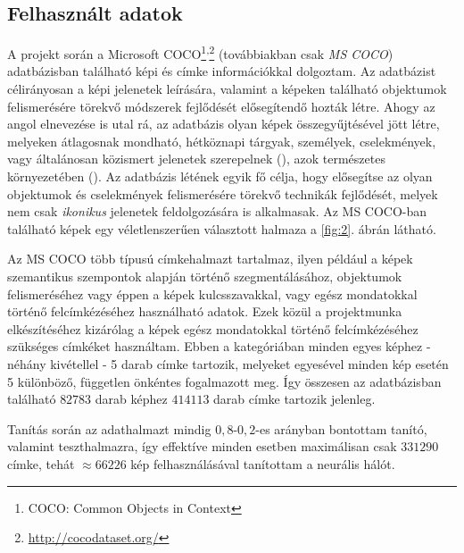 \begin{multicols}{2}
\section{Felhasznált adatok} \label{section:2}
A projekt során a Microsoft COCO\footnote{COCO: Common Objects in Context}\textsuperscript{,}\footnote{\url{http://cocodataset.org/}}\citep{2014arXiv1405.0312L} (továbbiakban csak \emph{MS COCO}) adatbázisban található képi és címke információkkal dolgoztam. Az adatbázist célirányosan a képi jelenetek leírására, valamint a képeken található objektumok felismerésére törekvő módszerek fejlődését elősegítendő hozták létre. Ahogy az angol elnevezése is utal rá, az adatbázis olyan képek összegyűjtésével jött létre, melyeken átlagosnak mondható, hétköznapi tárgyak, személyek, cselekmények, vagy általánosan közismert jelenetek szerepelnek (\emph{}), azok természetes környezetében (\emph{}). Az adatbázis létének egyik fő célja, hogy elősegítse az olyan objektumok és cselekmények felismerésére törekvő technikák fejlődését, melyek nem csak \emph{ikonikus} jelenetek feldolgozására is alkalmasak. Az MS COCO-ban található képek egy véletlenszerűen választott halmaza a \ref{fig:2}. ábrán látható. \par
Az MS COCO több típusú címkehalmazt tartalmaz, ilyen például a képek szemantikus szempontok alapján történő szegmentálásához, objektumok felismeréséhez vagy éppen a képek kulcsszavakkal, vagy egész mondatokkal történő felcímkézéséhez használható adatok. Ezek közül a projektmunka elkészítéséhez kizárólag a képek egész mondatokkal történő felcímkézéséhez szükséges címkéket használtam. Ebben a kategóriában minden egyes képhez - néhány kivétellel - 5 darab címke tartozik, melyeket egyesével minden kép esetén 5 különböző, független önkéntes fogalmazott meg. Így összesen az adatbázisban található $82783$ darab képhez $414113$ darab címke tartozik jelenleg. \par
Tanítás során az adathalmazt mindig $0,8$-$0,2$-es arányban bontottam tanító, valamint teszthalmazra, így effektíve minden esetben maximálisan csak $331290$ címke, tehát $\approx 66226$ kép felhasználásával tanítottam a neurális hálót.


\end{multicols}
